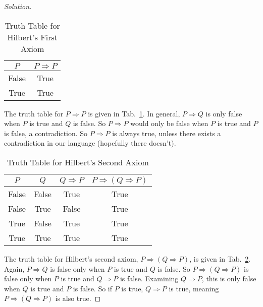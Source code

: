 \documentclass{article}
\theoremstyle{normal}
\begin{document}
    \begin{proof}[Solution]
        \begin{table}
            \centering
            \begin{tabular}{c | c}
                $P$&$P\Rightarrow{P}$\\
                \hline
                False&True\\
                True&True
            \end{tabular}
            \caption{Truth Table for Hilbert's First Axiom}
            \label{tab:hilbert_first}
        \end{table}
        The truth table for $P\Rightarrow{P}$ is given in
        Tab.~\ref{tab:hilbert_first}. In general, $P\Rightarrow{Q}$
        is only false when $P$ is true and $Q$ is false. So $P\Rightarrow{P}$
        would only be false when $P$ is true and $P$ is false, a contradiction.
        So $P\Rightarrow{P}$ is always true, unless there exists a contradiction
        in our language (hopefully there doesn't).
        \par\hfill\par
        \begin{table}
            \centering
            \begin{tabular}{c | c | c | c}
                $P$&$Q$&$Q\Rightarrow{P}$&$P\Rightarrow(Q\Rightarrow{P})$\\
                \hline
                False&False&True&True\\
                False&True&False&True\\
                True&False&True&True\\
                True&True&True&True
            \end{tabular}
            \caption{Truth Table for Hilbert's Second Axiom}
            \label{tab:hilbert_second}
        \end{table}
        The truth table for Hilbert's second axiom,
        $P\Rightarrow(Q\Rightarrow{P})$, is given in
        Tab.~\ref{tab:hilbert_second}. Again, $P\Rightarrow{Q}$ is false only
        when $P$ is true and $Q$ is false. So $P\Rightarrow(Q\Rightarrow{P})$
        is false only when $P$ is true and $Q\Rightarrow{P}$ is false.
        Examining $Q\Rightarrow{P}$, this is only false when $Q$ is true and
        $P$ is false. So if $P$ is true, $Q\Rightarrow{P}$ is true, meaning
        $P\Rightarrow(Q\Rightarrow{P})$ is also true.
        \par\hfill\par

\end{proof}
\end{document}
